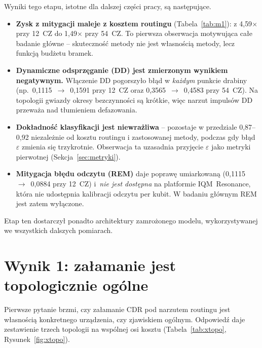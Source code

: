 \documentclass[11pt]{article}
\begin{document}
Wyniki tego etapu, istotne dla dalszej części pracy, są następujące.
\begin{itemize}
  \item \textbf{Zysk z mitygacji maleje z kosztem routingu} (Tabela~\ref{tab:m1}): z 4{,}59$\times$
        przy 12~CZ do 1{,}49$\times$ przy 54~CZ. To pierwsza obserwacja motywująca całe badanie
        główne -- skuteczność metody nie jest własnością metody, lecz funkcją budżetu bramek.
  \item \textbf{Dynamiczne odsprzęganie (DD) jest zmierzonym wynikiem negatywnym.} Włączenie DD
        pogorszyło błąd w \emph{każdym} punkcie drabiny (np.\ 0{,}1115~$\to$~0{,}1591 przy 12~CZ
        oraz 0{,}3565~$\to$~0{,}4583 przy 54~CZ). Na topologii gwiazdy okresy bezczynności są krótkie,
        więc narzut impulsów DD przeważa nad tłumieniem defazowania.
  \item \textbf{Dokładność klasyfikacji jest niewrażliwa} -- pozostaje w przedziale 0{,}87--0{,}92
        niezależnie od kosztu routingu i zastosowanej metody, podczas gdy błąd $\varepsilon$ zmienia
        się trzykrotnie. Obserwacja ta uzasadnia przyjęcie $\varepsilon$ jako metryki pierwotnej
        (Sekcja~\ref{sec:metryki}).
  \item \textbf{Mitygacja błędu odczytu (REM)} daje poprawę umiarkowaną (0{,}1115~$\to$~0{,}0884
        przy 12~CZ) i~\emph{nie jest dostępna} na platformie
        IQM~Resonance, która nie udostępnia kalibracji odczytu per kubit. W badaniu głównym REM jest
        zatem wyłączone.
\end{itemize}
Etap ten dostarczył ponadto architektury zamrożonego modelu, wykorzystywanej we wszystkich
dalszych pomiarach.

\section{Wynik 1: załamanie jest topologicznie ogólne}\label{sec:xtopo}

Pierwsze pytanie brzmi, czy załamanie CDR pod narzutem routingu jest własnością konkretnego
urządzenia, czy zjawiskiem ogólnym. Odpowiedź daje zestawienie trzech topologii na wspólnej osi
kosztu (Tabela~\ref{tab:xtopo}, Rysunek~\ref{fig:xtopo}).
\end{document}
